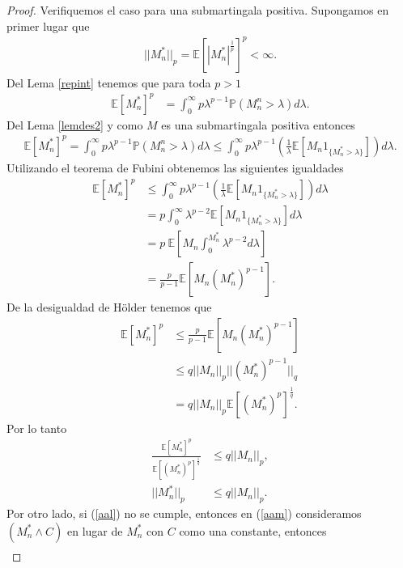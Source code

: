 \begin{proof}
Verifiquemos el caso para una submartingala positiva. Supongamos en primer lugar que
	\begin{align}
	||M_n^{*}||_p = \mathbb{E}[|M_n^{*}|^{\frac{1}{p}}]^p < \infty. \label{aal}
	\end{align}
Del Lema \ref{repint} tenemos que para toda $p > 1$
	\begin{align*}
	\mathbb{E}[M_n^{*}]^p & = \int_0^{\infty} p \lambda^{p-1} \mathbb{P}(M_n^{n} > \lambda) d\lambda.
	\end{align*}
Del Lema \ref{lemdes2} y como $M$ es una submartingala positiva entonces
	\begin{align*}
	\mathbb{E}[M_n^{*}]^p = \int_0^{\infty} p \lambda^{p-1} \mathbb{P}(M_n^{n} > \lambda) d\lambda  \leq \int_0^{\infty} p \lambda^{p-1} \left( \frac{1}{\lambda} \mathbb{E}[M_n 1_{\{M_n^{*} > \lambda\}}] \right) d\lambda.
	\end{align*}
Utilizando el teorema de Fubini obtenemos las siguientes igualdades
	\begin{align}
	\mathbb{E}[M_n^{*}]^p & \leq \int_0^{\infty} p \lambda^{p-1} \left( \frac{1}{\lambda} \mathbb{E}[M_n 1_{\{M_n^{*} > \lambda\}} ] \right) d\lambda \nonumber \\
	& = p  \int_0^{\infty} \lambda^{p-2} \mathbb{E}[M_n 1_{\{M_n^{*} > \lambda\}}] d\lambda \nonumber \\
	& = p \ \mathbb{E} \left[ M_n \int_0^{M_n^{*}} \lambda^{p-2} d\lambda \right] \nonumber \\
	& = \frac{p}{p-1} \mathbb{E}[M_n (M_n^{*})^{p-1}]. \label{aam}
	\end{align}
De la desigualdad de Hölder tenemos que
	\begin{align*}
	\mathbb{E}[M_n^{*}]^p & \leq \frac{p}{p-1} \mathbb{E}[M_n (M_n^{*})^{p-1}] \\
	& \leq q ||M_n||_p ||(M_n^{*})^{p-1}||_q \\
	& = q ||M_n||_p \mathbb{E}[(M_n^{*})^p]^{\frac{1}{q}}.
	\end{align*}
Por lo tanto
	\begin{align*}
	\frac{\mathbb{E}[M_n^{*}]^p}{\mathbb{E}[(M_n^{*})^p]^{\frac{1}{q}}} & \leq q ||M_n||_p, \\
	||M_n^{*}||_p & \leq q ||M_n||_p.
	\end{align*}
Por otro lado, si (\ref{aal}) no se cumple, entonces en (\ref{aam}) consideramos $(M_n^{*} \wedge C)$ en lugar de $M_n^{*}$ con $C$ como una constante, entonces
	\begin{align*}

\end{align*}
\end{proof}

